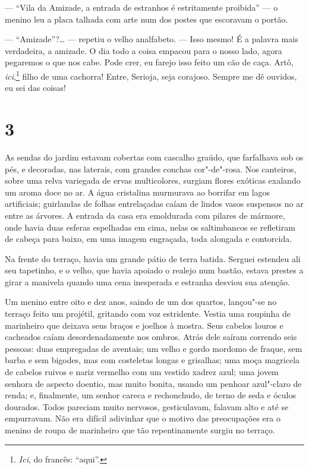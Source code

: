 --- ``Vila da Amizade, a entrada de estranhos é estritamente proibida''
--- o menino leu a placa talhada com arte num dos postes que escoravam o
portão.

--- ``Amizade''?\ldots{} --- repetiu o velho analfabeto. --- Isso mesmo! É a
palavra mais verdadeira, a amizade. O dia todo a coisa empacou para o
nosso lado, agora pegaremos o que nos cabe. Pode crer, eu farejo isso
feito um cão de caça. Artô, \emph{ici},\footnote{\emph{Ici}, do francês:
  ``aqui''.} filho de uma cachorra! Entre, Serioja, seja corajoso.
Sempre me dê ouvidos, eu sei das coisas!

\section{3}

As sendas do jardim estavam cobertas com cascalho graúdo, que farfalhava
sob os pés, e decoradas, nas laterais, com grandes conchas cor"-de"-rosa.
Nos canteiros, sobre uma relva variegada de ervas multicolores, surgiam
flores exóticas exalando um aroma doce no ar. A água cristalina
murmurava ao borrifar em lagos artificiais; guirlandas de folhas
entrelaçadas caíam de lindos vasos suspensos no ar entre as árvores. A
entrada da casa era emoldurada com pilares de mármore, onde havia duas
esferas espelhadas em cima, nelas os saltimbancos se refletiram de
cabeça para baixo, em uma imagem engraçada, toda alongada e contorcida.

Na frente do terraço, havia um grande pátio de terra batida. Serguei
estendeu ali seu tapetinho, e o velho, que havia apoiado o realejo num
bastão, estava prestes a girar a manivela quando uma cena inesperada e
estranha desviou sua atenção.

Um menino entre oito e dez anos, saindo de um dos quartos, lançou"-se no
terraço feito um projétil, gritando com voz estridente. Vestia uma
roupinha de marinheiro que deixava seus braços e joelhos à mostra. Seus
cabelos louros e cacheados caíam desordenadamente nos ombros. Atrás dele
saíram correndo seis pessoas: duas empregadas de aventais; um velho e
gordo mordomo de fraque, sem barba e sem bigodes, mas com costeletas
longas e grisalhas; uma moça magricela de cabelos ruivos e nariz
vermelho com um vestido xadrez azul; uma jovem senhora de aspecto
doentio, mas muito bonita, usando um penhoar azul"-claro de renda; e,
finalmente, um senhor careca e rechonchudo, de terno de seda e óculos
dourados. Todos pareciam muito nervosos, gesticulavam, falavam alto e
até se empurravam. Não era difícil adivinhar que o motivo das
preocupações era o menino de roupa de marinheiro que tão repentinamente
surgiu no terraço.

